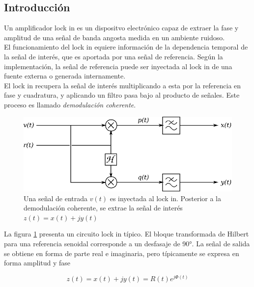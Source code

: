 \documentclass[11pt,a4paper]{extarticle}
\begin{document}
\begin{multicols}{2}
\section{Introducción}

Un amplificador lock in es un dispositvo electrónico capaz de extraer la fase y amplitud de una señal de banda angosta medida en un ambiente ruidoso.\\

El funcionamiento del lock in equiere información de la dependencia temporal de la señal de interés, que es aportada por una señal de referencia. Según la implementación, la señal de referencia puede ser inyectada al lock in de una fuente externa o generada internamente.\\ 

El lock in recupera la señal de interés multiplicando a esta por la referencia en fase y cuadratura, y aplicando un filtro pasa bajo al producto de señales. Este proceso es llamado \textit{demodulación coherente}.\\

\begin{figure}[H]
	\centering
	\includegraphics[width=\linewidth]{Images/lockin_gral.eps}
	\caption{Una señal de entrada $v(t)$ es inyectada al lock in. Posterior a la demodulación coherente, se extrae la señal de interés $z(t)=x(t)+jy(t)$}
	\label{fig:lockin}
\end{figure}

La figura \ref{fig:lockin} presenta un circuito lock in típico. El bloque transformada de Hilbert para una referencia senoidal corresponde a un desfasaje de 90°. La señal de salida se obtiene en forma de parte real e imaginaria, pero típicamente se expresa en forma amplitud y fase

\begin{equation*}
	z(t) = x(t) + j y(t) = R(t) e ^{j\Phi(t)}
\end{equation*}\\[-1em]


\end{multicols}
\end{document}
